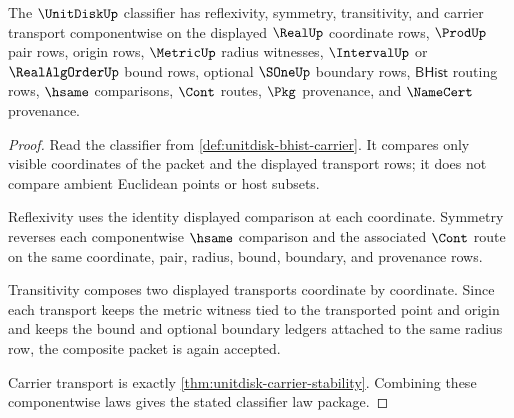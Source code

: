 \begin{theorem}
\label{thm:unitdisk-classifier-law-package}
The $\UnitDiskUp$ classifier has reflexivity, symmetry, transitivity, and carrier transport componentwise on the displayed $\RealUp$ coordinate rows, $\ProdUp$ pair rows, origin rows, $\MetricUp$ radius witnesses, $\IntervalUp$ or $\RealAlgOrderUp$ bound rows, optional $\SOneUp$ boundary rows, $\mathsf{BHist}$ routing rows, $\hsame$ comparisons, $\Cont$ routes, $\Pkg$ provenance, and $\NameCert$ provenance.
\end{theorem}
\begin{proof}
Read the classifier from \autoref{def:unitdisk-bhist-carrier}. It compares only visible coordinates of the packet and the displayed transport rows; it does not compare ambient Euclidean points or host subsets.

Reflexivity uses the identity displayed comparison at each coordinate. Symmetry reverses each componentwise $\hsame$ comparison and the associated $\Cont$ route on the same coordinate, pair, radius, bound, boundary, and provenance rows.

Transitivity composes two displayed transports coordinate by coordinate. Since each transport keeps the metric witness tied to the transported point and origin and keeps the bound and optional boundary ledgers attached to the same radius row, the composite packet is again accepted.

Carrier transport is exactly \autoref{thm:unitdisk-carrier-stability}. Combining these componentwise laws gives the stated classifier law package.
\end{proof}

